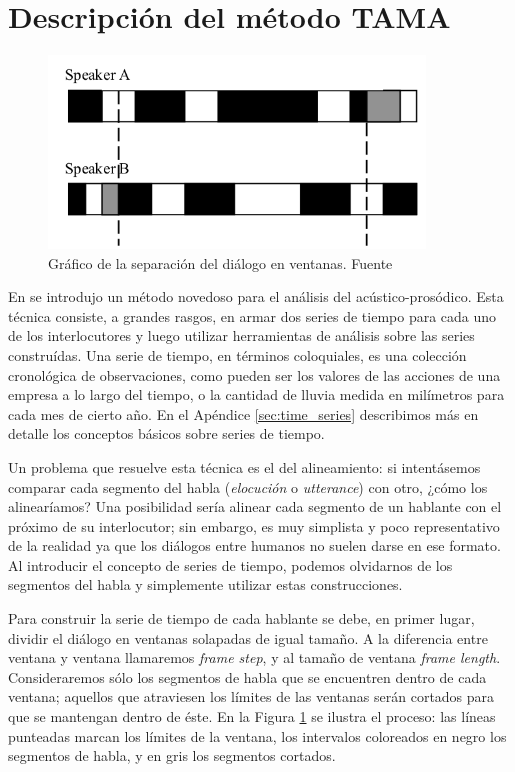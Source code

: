 \section{Descripción del método TAMA}
\label{sec:ant_tama}

\begin{figure}[t!]
\centering
\includegraphics[width=10cm]{images/tama.png}
\caption{Gráfico de la separación del diálogo en ventanas. Fuente \cite{KOU2008}}

\label{tama}
\end{figure}

En \cite{KOU2008} se introdujo un método novedoso para el análisis del \entrainment acústico-prosódico. Esta técnica consiste, a grandes rasgos, en armar dos series de tiempo para cada uno de los interlocutores y luego utilizar herramientas de análisis sobre las series construídas. Una serie de tiempo, en términos coloquiales, es una colección cronológica de observaciones, como pueden ser los valores de las acciones de una empresa a lo largo del tiempo, o la cantidad de lluvia medida en milímetros para cada mes de cierto año. En el Apéndice \ref{sec:time_series} describimos más en detalle los conceptos básicos sobre series de tiempo.

Un problema que resuelve esta técnica es el del alineamiento: si intentásemos comparar cada segmento del habla (\emph{elocución} o \emph{utterance}) con otro, ¿cómo los alinearíamos? Una posibilidad sería alinear cada segmento de un hablante con el próximo de su interlocutor; sin embargo, es muy simplista y poco representativo de la realidad ya que los diálogos entre humanos no suelen darse en ese formato. Al introducir el concepto de series de tiempo, podemos olvidarnos de los segmentos del habla y simplemente utilizar estas construcciones.

Para construir la serie de tiempo de cada hablante se debe, en primer lugar, dividir el diálogo en ventanas solapadas de igual tamaño. A la diferencia entre ventana y ventana llamaremos \emph{frame step}, y al tamaño de ventana \emph{frame length}. Consideraremos sólo los segmentos de habla que se encuentren dentro de cada ventana; aquellos que atraviesen los límites de las ventanas serán cortados para que se mantengan dentro de éste. En la Figura \ref{tama} se ilustra el proceso: las líneas punteadas marcan los límites de la ventana, los intervalos coloreados en negro los segmentos de habla, y en gris los segmentos cortados.

